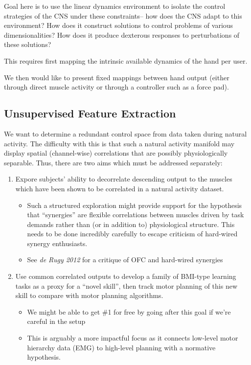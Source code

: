 \documentclass[
  a4paper,
]{article}
\providecommand{\tightlist}{%
  \setlength{\itemsep}{0pt}\setlength{\parskip}{0pt}}
\begin{document}
Goal here is to use the linear dynamics environment to isolate the
control strategies of the CNS under these constraints-- how does the CNS
adapt to this environment? How does it construct solutions to control
problems of various dimensionalities? How does it produce dexterous
responses to perturbations of these solutions?

This requires first mapping the intrinsic available dynamics of the hand
per user.

We then would like to present fixed mappings between hand output (either
through direct muscle activity or through a controller such as a force
pad).

\hypertarget{unsupervised-feature-extraction}{%
\subsection{Unsupervised Feature
Extraction}\label{unsupervised-feature-extraction}}

We want to determine a redundant control space from data taken during
natural activity. The difficulty with this is that such a natural
activity manifold may display spatial (channel-wise) correlations that
are possibly physiologically separable. Thus, there are two aims which
must be addressed separately:

\begin{enumerate}
\def\labelenumi{\arabic{enumi}.}
\tightlist
\item
  Expore subjects' ability to decorrelate descending output to the
  muscles which have been shown to be correlated in a natural activity
  dataset.

  \begin{itemize}
  \tightlist
  \item
    Such a structured exploration might provide support for the
    hypothesis that ``synergies'' are flexible correlations between
    muscles driven by task demands rather than (or in addition to)
    physiological structure. This needs to be done incredibly carefully
    to escape criticism of hard-wired synergy enthusiasts.
  \item
    See \emph{de Rugy 2012} for a critique of OFC and hard-wired
    synergies
  \end{itemize}
\item
  Use common correlated outputs to develop a family of BMI-type learning
  tasks as a proxy for a ``novel skill'', then track motor planning of
  this new skill to compare with motor planning algorithms.

  \begin{itemize}
  \tightlist
  \item
    We might be able to get \#1 for free by going after this goal if
    we're careful in the setup
  \item
    This is arguably a more impactful focus as it connects low-level
    motor hierarchy data (EMG) to high-level planning with a normative
    hypothesis.
  \end{itemize}
\end{enumerate}
\end{document}
